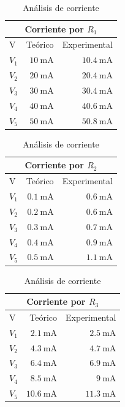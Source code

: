 \documentclass[colTwo]{NanouparIEEE}
\begin{document}
            \begin{table}[!htb]
                \centering\footnotesize\caption{Análisis de corriente}
                \begin{tabular}{lrr}
                    \multicolumn{3}{c}{\textbf{Corriente por $R_1$}}\\\hline
                    V & Teórico & Experimental \\\hline
                    $V_1$ & $\SI{10}{\milli\ampere}$ & $\SI{10.4}{\milli\ampere}$ \\\hline
                    $V_2$ & $\SI{20}{\milli\ampere}$ & $\SI{20.4}{\milli\ampere}$ \\\hline
                    $V_3$ & $\SI{30}{\milli\ampere}$ & $\SI{30.4}{\milli\ampere}$ \\\hline
                    $V_4$ & $\SI{40}{\milli\ampere}$ & $\SI{40.6}{\milli\ampere}$ \\\hline
                    $V_5$ & $\SI{50}{\milli\ampere}$ & $\SI{50.8}{\milli\ampere}$ \\\hline\hline
                \end{tabular}
                \begin{tabular}{lrr}
                    \multicolumn{3}{c}{\textbf{Corriente por $R_2$}}\\\hline
                    V & Teórico & Experimental \\\hline
                    $V_1$ & $\SI{0.1}{\milli\ampere}$ & $\SI{0.6}{\milli\ampere}$ \\\hline
                    $V_2$ & $\SI{0.2}{\milli\ampere}$ & $\SI{0.6}{\milli\ampere}$ \\\hline
                    $V_3$ & $\SI{0.3}{\milli\ampere}$ & $\SI{0.7}{\milli\ampere}$ \\\hline
                    $V_4$ & $\SI{0.4}{\milli\ampere}$ & $\SI{0.9}{\milli\ampere}$ \\\hline
                    $V_5$ & $\SI{0.5}{\milli\ampere}$ & $\SI{1.1}{\milli\ampere}$ \\\hline\hline
                \end{tabular}
                \begin{tabular}{lrr}
                    \multicolumn{3}{c}{\textbf{Corriente por $R_3$}}\\\hline
                    V & Teórico & Experimental \\\hline
                    $V_1$ & $\SI{2.1}{\milli\ampere}$ & $\SI{2.5}{\milli\ampere}$ \\\hline
                    $V_2$ & $\SI{4.3}{\milli\ampere}$ & $\SI{4.7}{\milli\ampere}$ \\\hline
                    $V_3$ & $\SI{6.4}{\milli\ampere}$ & $\SI{6.9}{\milli\ampere}$ \\\hline
                    $V_4$ & $\SI{8.5}{\milli\ampere}$ & $\SI{9}{\milli\ampere}$ \\\hline
                    $V_5$ & $\SI{10.6}{\milli\ampere}$ & $\SI{11.3}{\milli\ampere}$ \\\hline\hline
                \end{tabular}
            \end{table}
\end{document}
